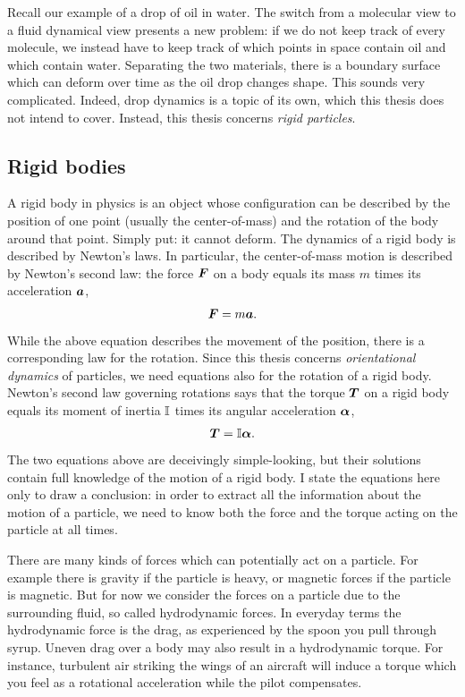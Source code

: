 \documentclass[thesis.tex]{subfiles}
\begin{document}
Recall our example of a drop of oil in water. The switch from a molecular view to a fluid dynamical view presents a new problem: if we do not keep track of every molecule, we instead have to keep track of which points in space contain oil and which contain water. Separating the two materials, there is a boundary surface which can deform over time as the oil drop changes shape. This sounds very complicated. Indeed, drop dynamics is a topic of its own, which this thesis does not intend to cover. Instead, this thesis concerns \emph{rigid particles}.

\subsection*{Rigid bodies}

A rigid body in physics is an object whose configuration can be described by the position of one point (usually the center-of-mass) and the rotation of the body around that point. Simply put: it cannot deform. The dynamics of a rigid body is described by Newton's laws. In particular, the center-of-mass motion is described by Newton's second law: the force $\mbox{\boldmath$F$}$ on a body equals its mass $m$ times its acceleration $\mbox{\boldmath$a$}$,
\begin{align*}
    \mbox{\boldmath$F$} = m\mbox{\boldmath$a$}.
\end{align*}
While the above equation describes the movement of the position, there is a corresponding law for the rotation. Since this thesis concerns \emph{orientational dynamics} of particles, we need equations also for the rotation of a rigid body. Newton's second law governing rotations says that the torque $\mbox{\boldmath$T$}$ on a rigid body equals its moment of inertia $\mathbb{I}$ times its angular acceleration $\mbox{\boldmath$\alpha$}$,
\begin{align*}
    \mbox{\boldmath$T$} = \mathbb{I} \mbox{\boldmath$\alpha$}.
\end{align*}
The two equations above are deceivingly simple-looking, but their solutions contain full knowledge of the motion of a rigid body. I state the equations here only to draw a conclusion: in order to extract all the information about the motion of a particle, we need to know both the force and the torque acting on the particle at all times.

There are many kinds of forces which can potentially act on a particle. For example there is gravity if the particle is heavy, or magnetic forces if the particle is magnetic. But for now we consider the forces on a particle due to the surrounding fluid, so called hydrodynamic forces. In everyday terms the hydrodynamic force is the drag, as experienced by the spoon you pull through syrup. Uneven drag over a body may also result in a hydrodynamic torque. For instance, turbulent air striking the wings of an aircraft will induce a torque which you feel as a rotational acceleration while the pilot compensates.
\end{document}
